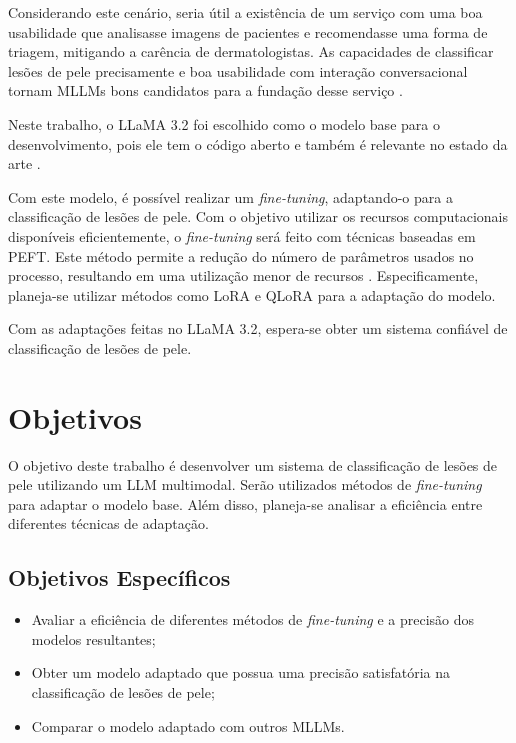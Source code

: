 Considerando este cenário, seria útil a existência de um serviço com uma boa usabilidade que analisasse imagens de pacientes e recomendasse uma forma de triagem,
mitigando a carência de dermatologistas. As capacidades de classificar lesões de pele precisamente e boa usabilidade com interação conversacional tornam \acp{MLLM}
bons candidatos para a fundação desse serviço \cite{mllm_success_rate}.

Neste trabalho, o \ac{LLaMA} 3.2 foi escolhido como o modelo base para o desenvolvimento, pois ele tem o código aberto e também é relevante no estado da arte
\cite{dubey2024llama}.


Com este modelo, é possível realizar um \textit{fine-tuning}, adaptando-o para a classificação de lesões de pele. Com o objetivo utilizar os recursos computacionais
disponíveis eficientemente, o \textit{fine-tuning} será feito com técnicas baseadas em \ac{PEFT}. Este método permite a redução do número de parâmetros usados no
processo, resultando em uma utilização menor de recursos \cite{peft}. Especificamente, planeja-se utilizar métodos como \ac{LoRA} e \ac{QLoRA} para a adaptação do modelo.

Com as adaptações feitas no \ac{LLaMA} 3.2, espera-se obter um sistema confiável de classificação de lesões de pele.


\section{Objetivos}

O objetivo deste trabalho é desenvolver um sistema de classificação de lesões de pele utilizando um \ac{LLM} multimodal. Serão utilizados métodos de \textit{fine-tuning}
para adaptar o modelo base. Além disso, planeja-se analisar a eficiência entre diferentes técnicas de adaptação.

\subsection*{Objetivos Específicos}

\begin{itemize}
    \item Avaliar a eficiência de diferentes métodos de \textit{fine-tuning} e a precisão dos modelos resultantes;
    \item Obter um modelo adaptado que possua uma precisão satisfatória na classificação de lesões de pele;
    \item Comparar o modelo adaptado com outros \acp{MLLM}.
\end{itemize}
